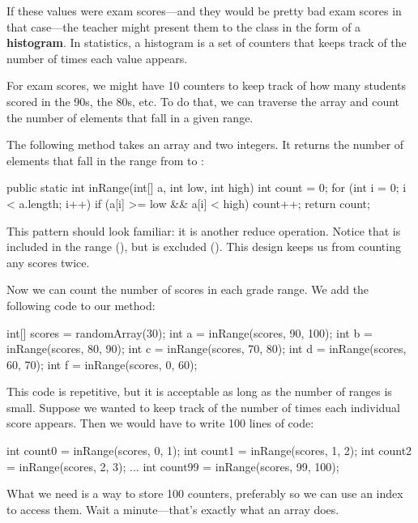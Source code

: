 If these values were exam scores---and they would be pretty bad exam scores in that case---the teacher might present them to the class in the form of a {\bf histogram}.
In statistics, a histogram is a set of counters that keeps track of the number of times each value appears.

For exam scores, we might have 10 counters to keep track of how many students scored in the 90s, the 80s, etc.
To do that, we can traverse the array and count the number of elements that fall in a given range.

The following method takes an array and two integers.
It returns the number of elements that fall in the range from  to :

\begin{code}
public static int inRange(int[] a, int low, int high) {
    int count = 0;
    for (int i = 0; i < a.length; i++) {
        if (a[i] >= low && a[i] < high) {
            count++;
        }
    }
    return count;
}
\end{code}


This pattern should look familiar: it is another reduce operation.
Notice that  is included in the range (\java{>=}), but  is excluded (\java{<}).
This design keeps us from counting any scores twice.

Now we can count the number of scores in each grade range.
We add the following code to our  method:

\begin{code}
int[] scores = randomArray(30);
int a = inRange(scores, 90, 100);
int b = inRange(scores, 80, 90);
int c = inRange(scores, 70, 80);
int d = inRange(scores, 60, 70);
int f = inRange(scores, 0, 60);
\end{code}

This code is repetitive, but it is acceptable as long as the number of ranges is small.
Suppose we wanted to keep track of the number of times each individual score appears.
Then we would have to write 100 lines of code:

\begin{code}
int count0 = inRange(scores, 0, 1);
int count1 = inRange(scores, 1, 2);
int count2 = inRange(scores, 2, 3);
...
int count99 = inRange(scores, 99, 100);
\end{code}

What we need is a way to store 100 counters, preferably so we can use an index to access them.
Wait a minute---that's exactly what an array does.

